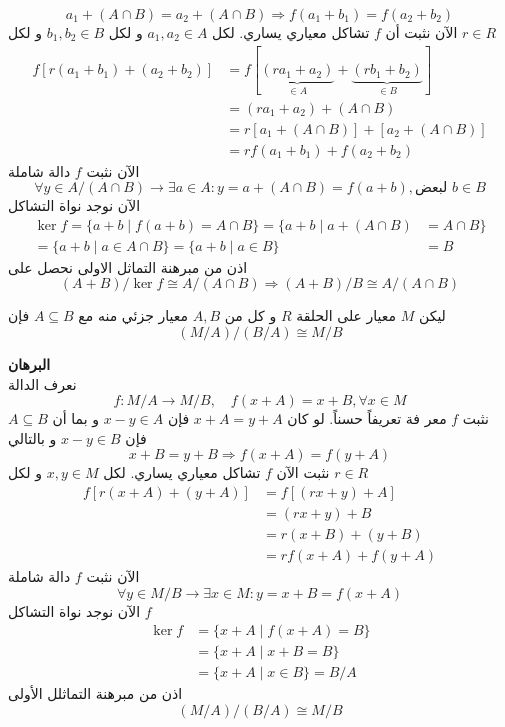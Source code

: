 \[
a_1 + (A\cap B) = a_2 + (A\cap B) \Rightarrow f(a_1 + b_1) = f(a_2+b_2)
\] 
الآن نثبت أن $f$ تشاكل معياري يساري. لكل $a_1,a_2\in A$ و لكل $b_1,b_2\in B$ و لكل $r\in R$
\begin{align*}
	f[r(a_1+b_1)+(a_2+b_2)] &= f[\underbrace{(ra_1+a_2)}_{\in A} + \underbrace{(rb_1+b_2)}_{\in B}]\\
	&= (ra_1+a_2) + (A\cap B) \\
	&= r[a_1+(A\cap B)] + [a_2 + (A\cap B)]\\
	&= rf(a_1+b_1) + f(a_2+b_2) 
\end{align*}
الآن نثبت $f$ دالة شاملة
\[
\forall y\in A/(A\cap B) \to \exists a\in A: y=a+(A\cap B) = f(a+b), \text{لبعض $b\in B$} 
\]
الآن نوجد نواة التشاكل
\begin{align*}
	\ker f = \{a+b \mid f(a+b) = A\cap B\}
	= \{a+b \mid a+(A\cap B) &= A\cap B\} \\
	= \{a+b\mid a\in A\cap B\}=
	 \{a+b \mid a\in B\} &= B
\end{align*}
اذن من مبرهنة التماثل الاولى نحصل على
\[
\boxed{(A+B)/\ker f \cong A/(A\cap B)} \Rightarrow \boxed{(A+B)/B \cong A/(A\cap B)}
\]

\begin{theorem}
	 ليكن $M$ معيار على الحلقة $R$ و كل من $A, B$ معيار جزئي منه مع $A\subseteq B$ فإن
	 \[
	 (M/A) / (B/A) \cong M/B
	 \]
\end{theorem}
\noindent
\textbf{البرهان}\\
\noindent
نعرف الدالة
\[
f:M/A \to M/B, \quad f(x+A) = x+B, \forall x\in M
\]
نثبت $f$ معر فة تعريفاً حسناً. لو كان $x+A=y+A$ فإن $x-y\in A$ و بما أن $A\subseteq B$ فإن $x-y\in B$ و بالتالي
\[
x+B = y+B \Rightarrow f(x+A) = f(y+A)
\]  
نثبت الآن $f$ تشاكل معياري يساري. لكل $x,y\in M$ و لكل $r\in R$
\begin{align*}
	f[r(x+A) + (y+A)] &= f[(rx+y) + A] \\
	&= (rx+y) + B\\
	&= r(x+B) + (y+B)\\
	&= rf(x+A) + f(y+A)
\end{align*}
الآن نثبت $f$ دالة شاملة
\[
\forall y\in M/B \to \exists x\in M : y = x+B = f(x+A) 
\]
الآن نوجد نواة التشاكل $f$
\begin{align*}
	\ker f &= \{x+A \mid f(x+A) = B\}\\
	&= \{x+A\mid x+B = B\}\\
	&= \{x+A\mid x\in B\}= B/A 
\end{align*}
اذن من مبرهنة التماثلل الأولى
\[
(M/A) / (B/A) \cong M/B 
\]



